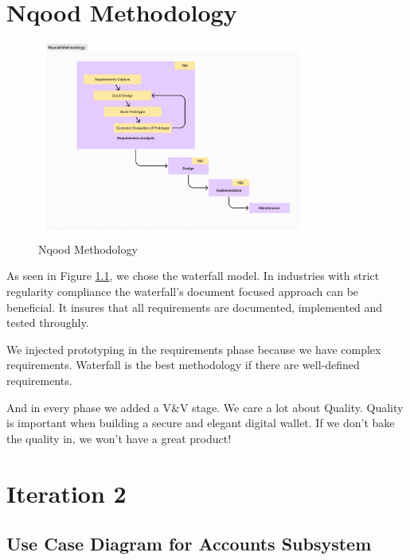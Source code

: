 \documentclass[a4paper]{report}
\begin{document}
\chapter{Nqood Methodology}

\begin{figure}[h!]
    \centering
    \includegraphics[width=0.8\textwidth]{images/nqood-methodology.png}
    \caption{Nqood Methodology}
    \label{fig:nqood-methodology}
\end{figure}

As seen in Figure \ref{fig:nqood-methodology}, we chose the waterfall model. In industries with strict regularity compliance the waterfall's
document focused approach can be beneficial. It insures that all requirements are documented, implemented and tested
throughly.

We injected prototyping in the requirements phase because we have complex requirements. Waterfall is the best methodology if there are well-defined requirements.

And in every phase we added a V\&V stage. We care a lot about Quality. Quality is important when building a secure and elegant digital wallet. If we don't bake the quality in, we won't have a great product!

\chapter{Iteration 2}

\section{Use Case Diagram for Accounts Subsystem}
\end{document}
